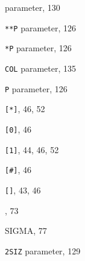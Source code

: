 \begin{theindex}

  \item {\tt *}
     parameter, 130
  \item {\tt ***P}
     parameter, 126
  \item {\tt **P}
     parameter, 126
  \item {\tt *COL}
     parameter, 135
  \item {\tt *P}
     parameter, 126
  \item \texttt  {[*]}, 46, 52
  \item \texttt  {[0]}, 46
  \item \texttt  {[1]}, 44, 46, 52
  \item \texttt  {[\#]}, 46
  \item \texttt  {[\texttt  {\relax }]}, 43, 46
  \item \Chap, 73
  \item \protect\dollar SIGMA, 77
  \item {\tt 2SIZ}
     parameter, 129

  \indexspace


\end{theindex}
